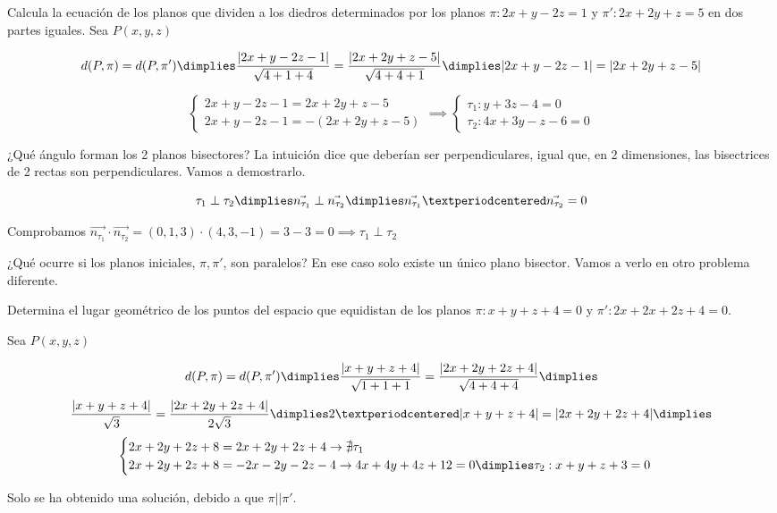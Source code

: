 \begin{problem}
Calcula la ecuación de los planos que dividen a los diedros determinados por los planos $\pi:2x+y-2z=1$ y $\pi': 2x+2y+z=5$ en dos partes iguales.
\solution
Sea $P(x,y,z)$

\[d(P,\pi) = d(P,\pi') \dimplies \frac{|2x+y-2z-1|}{\sqrt{4+1+4}} = \frac{|2x+2y+z-5|}{\sqrt{4+4+1}} \dimplies |2x+y-2z-1| = |2x+2y+z-5|\]

\[
\begin{cases}
2x+y-2z-1 = 2x+2y+z-5\\
2x+y-2z-1 =-\left(2x+2y+z-5\right)
\end{cases}\implies 
\begin{cases}
\tau_1: y+3z-4 = 0\\
\tau_2: 4x+3y-z-6=0
\end{cases}
\]


\obs ¿Qué ángulo forman los 2 planos bisectores? La intuición dice que deberían ser perpendiculares, igual que, en 2 dimensiones, las bisectrices de 2 rectas son perpendiculares. 
%
Vamos a demostrarlo.

\[
\tau_1 \perp\tau_2 \dimplies \vec{n_{\tau_1}} \perp \vec{n_{\tau_2}} \dimplies \vec{n_{\tau_1}}·\vec{n_{\tau_2}} = 0
\]

Comprobamos $\vec{n_{\tau_1}}·\vec{n_{\tau_2}} = (0,1,3)·(4,3,-1) = 3-3=0\implies \tau_1 \perp\tau_2 $

¿Qué ocurre si los planos iniciales, $\pi,\pi'$, son paralelos? En ese caso solo existe un único plano bisector. Vamos a verlo en otro problema diferente.
\end{problem}

\begin{problem}

Determina el lugar geométrico de los puntos del espacio que equidistan de los planos $\pi: x+y+z+4=0$ y $\pi':2x+2x+2z+4=0$.

\solution

Sea $P(x,y,z)$

\[
  d(P,\pi) = d(P,\pi') \dimplies \frac{|x+y+z+4|}{\sqrt{1+1+1}} = \frac{|2x+2y+2z+4|}{\sqrt{4+4+4}} \dimplies 
\]
\[
  \frac{|x+y+z+4|}{\sqrt{3}} = \frac{|2x+2y+2z+4|}{2\sqrt{3}} \dimplies 2·|x+y+z+4| = |2x+2y+2z+4|\dimplies 
\]
\[
\begin{cases}
  2x+2y+2z+8=2x+2y+2z+4 \to \nexists \tau_1\\
  2x+2y+2z+8=-2x-2y-2z-4 \to 4x+4y+4z+12 = 0 \dimplies \tau_2: x+y+z+3=0
\end{cases}
\]

Solo se ha obtenido una solución, debido a que $\pi||\pi'$.
\end{problem}


